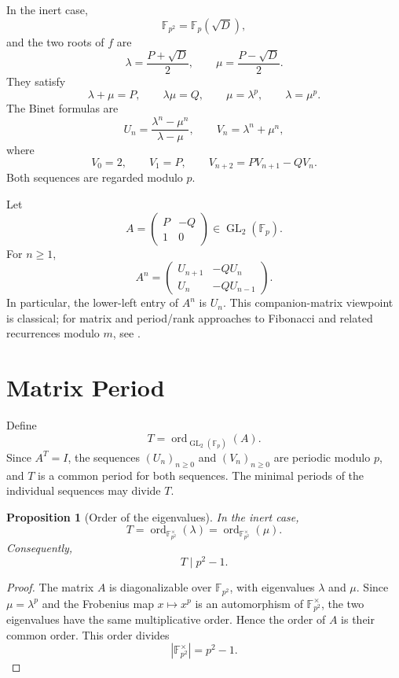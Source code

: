 \documentclass[11pt]{article}
\newcommand{\ord}{\operatorname{ord}}
\newcommand{\Fp}{\mathbb{F}_p}
\newcommand{\Fpq}{\mathbb{F}_{p^2}}
\theoremstyle{plain}
\newtheorem{proposition}[theorem]{Proposition}
\theoremstyle{definition}
\begin{document}
In the inert case,
\[
 \Fpq=\Fp(\sqrt D),
\]
and the two roots of $f$ are
\[
 \lambda=\frac{P+\sqrt D}{2},
 \qquad
 \mu=\frac{P-\sqrt D}{2}.
\]
They satisfy
\[
 \lambda+\mu=P,\qquad \lambda\mu=Q,
 \qquad \mu=\lambda^p,\qquad \lambda=\mu^p.
\]
The Binet formulas are
\begin{equation}
 U_n=\frac{\lambda^n-\mu^n}{\lambda-\mu},
 \qquad
 V_n=\lambda^n+\mu^n,
 \label{eq:binet}
\end{equation}
where
\[
 V_0=2,\qquad V_1=P,\qquad
 V_{n+2}=P V_{n+1}-Q V_n.
\]
Both sequences are regarded modulo $p$.

Let
\[
 A=
 \begin{pmatrix}
 P&-Q\\
 1&0
 \end{pmatrix}
 \in\operatorname{GL}_2(\Fp).
\]
For $n\geq1$,
\begin{equation}
 A^n=
 \begin{pmatrix}
 U_{n+1}&-Q U_n\\
 U_n&-Q U_{n-1}
 \end{pmatrix}.
 \label{eq:matrix-power}
\end{equation}
In particular, the lower-left entry of $A^n$ is $U_n$. This companion-matrix viewpoint is classical; for matrix and period/rank approaches to Fibonacci and related recurrences modulo $m$, see \cite{Robinson1963,Wall1960,Vinson1963,Renault2013}.

\section{Matrix Period}

Define
\[
 T=\ord_{\operatorname{GL}_2(\Fp)}(A).
\]
Since $A^T=I$, the sequences $(U_n)_{n\geq0}$ and $(V_n)_{n\geq0}$ are periodic modulo $p$, and $T$ is a common period for both sequences. The minimal periods of the individual sequences may divide $T$.

\begin{proposition}[Order of the eigenvalues]
\label{prop:eigenvalue-order}
In the inert case,
\[
 T=\ord_{\Fpq^\times}(\lambda)
  =\ord_{\Fpq^\times}(\mu).
\]
Consequently,
\[
 T\mid p^2-1.
\]
\end{proposition}

\begin{proof}
The matrix $A$ is diagonalizable over $\Fpq$, with eigenvalues $\lambda$ and $\mu$. Since $\mu=\lambda^p$ and the Frobenius map $x\mapsto x^p$ is an automorphism of $\Fpq^\times$, the two eigenvalues have the same multiplicative order. Hence the order of $A$ is their common order. This order divides
\[
 |\Fpq^\times|=p^2-1.
\]
\end{proof}
\end{document}
